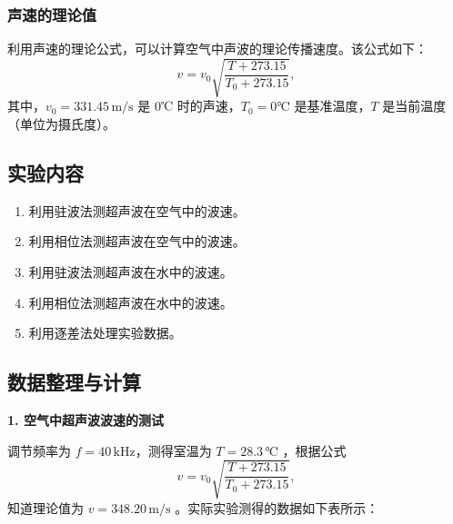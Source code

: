 \documentclass[zihao=5, UTF8]{article}
\theoremstyle{MyLineTheoremStyle} %
\theoremstyle{MyBlockTheoremStyle} %
\theoremstyle{MySubsubsectionStyle} %
\begin{document}
\subsubsection{声速的理论值}

利用声速的理论公式，可以计算空气中声波的理论传播速度。该公式如下：
\[
    v = v_0 \sqrt{\frac{T + 273.15}{T_0 + 273.15}},
\]
其中，$v_0 = 331.45 \, \text{m/s}$ 是 0℃ 时的声速，$T_0 = 0℃$ 是基准温度，$T$ 是当前温度（单位为摄氏度）。


\subsection{实验内容}

\begin{enumerate}
	\item 利用驻波法测超声波在空气中的波速。
	\item 利用相位法测超声波在空气中的波速。
	\item 利用驻波法测超声波在水中的波速。
	\item 利用相位法测超声波在水中的波速。
	\item 利用逐差法处理实验数据。
\end{enumerate}

\subsection{数据整理与计算}

\noindent \textbf{1. 空气中超声波波速的测试}

调节频率为 $f = 40 \, \text{kHz}$，测得室温为 $T = 28.3 \, \text{℃}$ ，根据公式
\[
    v = v_0 \sqrt{\frac{T + 273.15}{T_0 + 273.15}},
\]
知道理论值为 $v = 348.20 \, \text{m/s}$ 。实际实验测得的数据如下表所示：
\end{document}
